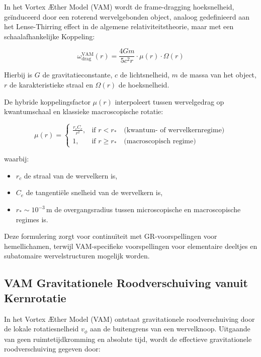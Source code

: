 In het Vortex Æther Model (VAM) wordt de frame-dragging hoeksnelheid, geïnduceerd door een roterend wervelgebonden object, analoog gedefinieerd aan het Lense-Thirring effect in de algemene relativiteitstheorie, maar met een schaalafhankelijke Koppeling:

\begin{equation}
    \omega_\text{drag}^\text{VAM}(r) =
    \frac{4 G m}{5 c^2 r} \cdot \mu(r) \cdot \Omega(r)
\end{equation}

Hierbij is \( G \) de gravitatieconstante, \( c \) de lichtsnelheid, \( m \) de massa van het object, \( r \) de karakteristieke straal en \( \Omega(r) \) de hoeksnelheid.

De hybride koppelingsfactor \( \mu(r) \) interpoleert tussen wervelgedrag op kwantumschaal en klassieke macroscopische rotatie:

\begin{equation}
    \mu(r) =
    \begin{cases}
        \displaystyle \frac{r_c C_e}{r^2}, & \text{if } r < r_\ast \quad \text{(kwantum- of wervelkernregime)} \\
        1, & \text{if } r \geq r_\ast \quad \text{(macroscopisch regime)}
    \end{cases}
\end{equation}

waarbij:
\begin{itemize}
    \item \( r_c \) de straal van de wervelkern is,
    \item \( C_e \) de tangentiële snelheid van de wervelkern is,
    \item \( r_\ast \sim 10^{-3} \, \text{m} \) de overgangsradius tussen microscopische en macroscopische regimes is.
\end{itemize}

Deze formulering zorgt voor continuïteit met GR-voorspellingen voor hemellichamen, terwijl VAM-specifieke voorspellingen voor elementaire deeltjes en subatomaire wervelstructuren mogelijk worden.


\subsection*{VAM Gravitationele Roodverschuiving vanuit Kernrotatie}

In het Vortex Æther Model (VAM) ontstaat gravitationele roodverschuiving door de lokale rotatiesnelheid \( v_\phi \) aan de buitengrens van een wervelknoop. Uitgaande van geen ruimtetijdkromming en absolute tijd, wordt de effectieve gravitationele roodverschuiving gegeven door:

